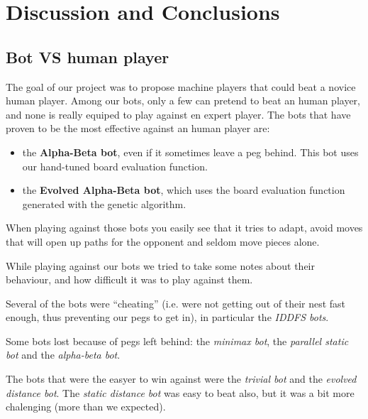 \section{Discussion and Conclusions}
\subsection{Bot VS human player}
The goal of our project was to propose machine players that could beat a
novice human player. Among our bots, only a few can pretend to beat an human
player, and none is really equiped to play against en expert player. The bots
that have proven to be the most effective against an human player are:

\begin{itemize}
  \item the \textbf{Alpha-Beta bot}, even if it sometimes leave a peg behind.
        This bot uses our hand-tuned board evaluation function.
  \item the \textbf{Evolved Alpha-Beta bot}, which uses the board evaluation
        function generated with the genetic algorithm.
\end{itemize}

When playing against those bots you easily see that it tries to adapt, avoid
moves that will open up paths for the opponent and seldom move pieces alone.

While playing against our bots we tried to take some notes about their
behaviour, and how difficult it was to play against them.

Several of the bots were ``cheating'' (i.e. were not getting out of their
nest fast enough, thus preventing our pegs to get in), in particular the
\textit{IDDFS bots}.

Some bots lost because of pegs left behind: the \textit{minimax bot}, the
\textit{parallel static bot} and the \textit{alpha-beta bot}.

The bots that were the easyer to win against were the \textit{trivial bot} and
the \textit{evolved distance bot}. The \textit{static distance bot} was easy
to beat also, but it was a bit more chalenging (more than we expected).


